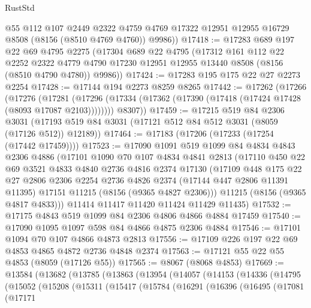 \begin{lexlean}{RustStd}
\begin{coremodule}
        @55
        @112
        @107
        @2449
        @2322
        @4759
        @4769
        @17322
        @12951
        @12955
        @16729
        @8508
        (@8156 (@8510 @4769 @4760))
        @9986))
@17418 := @17283
    @689
    @197
    @22
    @69
    @4795
    @2275
    (@17304
      @689
      @22
      @4795
      (@17312
        @161
        @112
        @22
        @2252
        @2322
        @4779
        @4790
        @17230
        @12951
        @12955
        @13440
        @8508
        (@8156 (@8510 @4790 @4780))
        @9986))
@17424 := @17283 @195 @175 @22 @27 @2273 @2254
@17428 := @17144 @194 @2273 @8259 @8265
@17442 := @17262
    (@17266
      (@17276
        (@17281 (@17296 (@17334 (@17362 (@17390 (@17418 (@17424 @17428 (@8093 @17087 @2103))))))))
        @8307))
@17459 := @17215
    @519
    @84
    @2306
    @3031
    (@17193 @519 @84 @3031 (@17121 @512 @84 @512 @3031 (@8059 (@17126 @512)) @12189))
@17464 := @17183 (@17206 (@17233 (@17254 (@17442 @17459))))
@17523 := @17090
    @1091
    @519
    @1099
    @84
    @4834
    @4843
    @2306
    @4886
    (@17101
      @1090
      @70
      @107
      @4834
      @4841
      @2813
      (@17110
        @450
        @22
        @69
        @3521
        @4833
        @4840
        @2736
        @4816
        @2374
        @17130
        (@17109
          @448
          @175
          @22
          @27
          @2806
          @2306
          @2254
          @2736
          @4826
          @2374
          (@17144 @447 @2806 @11391 @11395)
          @17151
          @11215
          (@8156 (@9365 @4827 @2306)))
        @11215
        (@8156 (@9365 @4817 @4833)))
      @11414
      @11417
      @11420
      @11424
      @11429
      @11435)
@17532 := @17175 @4843 @519 @1099 @84 @2306 @4806 @4866 @4884 @17459
@17540 := @17090 @1095 @1097 @598 @84 @4866 @4875 @2306 @4884
@17546 := @17101 @1094 @70 @107 @4866 @4873 @2813
@17556 := @17109 @226 @197 @22 @69 @4853 @4865 @4872 @2736 @4848 @2374
@17563 := @17121 @55 @22 @55 @4853 (@8059 (@17126 @55))
@17565 := @8067 (@8068 @4853)
@17669 := @13584
    (@13682
      (@13785
        (@13863
          (@13954
            (@14057
              (@14153
                (@14336
                  (@14795
                    (@15052
                      (@15208
                        (@15311
                          (@15417
                            (@15784
                              (@16291
                                (@16396
                                  (@16495
                                    (@17081
                                      (@17171

\end{coremodule}
\end{lexlean}
